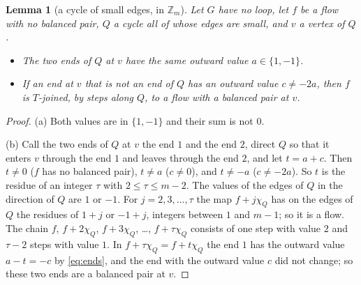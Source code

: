 \documentclass[11pt]{article}
\newtheorem{lemma}[theorem]{Lemma}
\theoremstyle{definition}
\newcommand{\Z}{\mathbb{Z}}
\begin{document}
\begin{lemma}[a cycle of small edges, in $\Z_m$]\label{lem:Bcyc}
Let $G$ have no loop, let $f$ be a flow with no balanced pair, $Q$ a cycle all of whose edges are small, and $v$ a
vertex of $Q$.
\begin{itemize}
\item[(a)] The two ends of $Q$ at $v$ have the same outward value $a\in\{1,-1\}$.
\item[(b)] If an end at $v$ that is not an end of $Q$ has an outward value $c\ne -2a$, then $f$ is $T$-joined, by steps along $Q$, to a
flow with a balanced pair at $v$.
\end{itemize}
\end{lemma}
\begin{proof}
(a) Both values are in $\{1,-1\}$ and their sum is not $0$.

(b) Call the two ends of $Q$ at $v$ the end $1$ and the end $2$, direct $Q$ so that it enters $v$ through the end
$1$ and leaves through the end $2$, and let $t=a+c$. Then $t\ne
0$ ($f$ has no balanced pair), $t\ne a$ ($c\ne 0$), and $t\ne -a$ ($c\ne -2a$). So $t$ is the residue of an integer
$\tau$ with $2\le\tau\le m-2$. The values of the edges of $Q$ in the direction of $Q$ are $1$ or $-1$. For
$j=2,3,\dots,\tau$ the map $f+j\chi_Q$ has on the edges of $Q$ the residues of $1+j$ or $-1+j$, integers between $1$ and
$m-1$; so it is a flow. The chain $f$, $f+2\chi_Q$, $f+3\chi_Q$, \dots, $f+\tau\chi_Q$ consists of one step with
value $2$ and $\tau-2$ steps with value $1$. In $f+\tau\chi_Q=f+t\chi_Q$ the end $1$ has the outward value $a-t=-c$ by
\eqref{eq:ends}, and the end with the outward value $c$ did not change; so these two ends are a balanced pair at $v$.
\end{proof}
\end{document}
